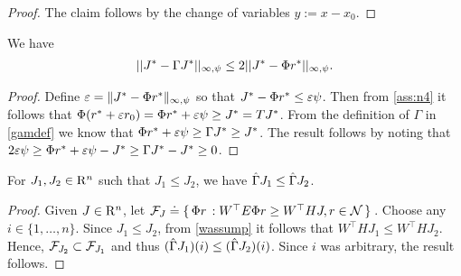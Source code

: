\begin{proof}
The claim follows by the change of variables $y := x-x_0$.
\end{proof}
\noindent 
\begin{lemma}\label{bestbndmn}
We have
\begin{align}
||J^*-\Gamma J^*||_{\infty,\psi}\leq 2||J^*-\Phi r^*||_{\infty,\psi}.
\end{align}
\end{lemma}
\begin{proof}
Define $\varepsilon = \|J^* - \Phi r^*\|_{\infty,\psi}$ so that
$ J^*-\Phi r^* \le \varepsilon \psi$. Then from \cref{ass:n4} it follows that $\Phi( r^* + \varepsilon r_0 ) = \Phi r^* + \varepsilon \psi \ge J^* = T J^*$. From the definition of $\Gamma$ in \eqref{gamdef} we know that $\Phi r^*+\varepsilon \psi \geq \Gamma J^*\geq J^*$. The result follows by noting that $2\varepsilon\psi\geq \Phi r^*+\varepsilon\psi -J^*\geq \Gamma J^*-J^*\geq 0$.
\end{proof}
\begin{lemma}\label{tgmonotone}
For $J_1, J_2\in \mathrm{R}^n$ such that $J_1\leq J_2$, we have $\hat{\Gamma} J_1\leq \hat{\Gamma} J_2$.
\end{lemma}
\begin{proof}
Given $J\in \mathrm{R}^n$, let $\mathcal{F}_J\doteq\{\,\Phi r\,: W^\top E \Phi r\geq W^\top HJ, r\in \mathcal{N}\,\}\,$. Choose any $i\in \{1,\ldots,n\}$. Since $J_1\leq J_2$, from \cref{wassump} it follows that $W^\top H J_1\leq W^\top H J_2$. Hence, $\mathcal{F}_{J_2} \subset \mathcal{F}_{J_1}$ and thus $(\hat{\Gamma} J_1)(i) \le (\hat{\Gamma} J_2)(i)$.  Since $i$ was arbitrary, the result follows. 
\end{proof}

